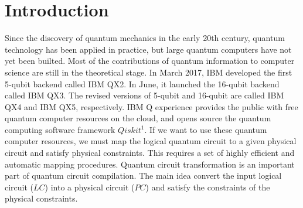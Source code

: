 \documentclass[runningheads]{llncs}
\begin{document}
\section{Introduction}
\label{Introduction}
Since the discovery of quantum mechanics in the early 20th century,
quantum technology has been applied in practice, but large quantum computers
have not yet been builted. Most of the contributions of quantum 
information to computer science are still in the theoretical stage.
In March 2017, IBM developed the first 5-qubit backend called IBM QX2. 
In June, it launched the 16-qubit backend called IBM QX3. 
The revised versions of 5-qubit and 16-qubit 
are called IBM QX4 and IBM QX5, respectively.
IBM Q experience provides the public with free quantum computer resources on the cloud,
and opens source the quantum computing software framework $Qiskit^{1}$. 
If we want to use these quantum computer resources, 
we must map  the logical quantum circuit to a given physical circuit and 
satisfy physical constraints. This requires a set of highly efficient and 
automatic mapping procedures. Quantum circuit transformation is an important 
part of quantum circuit compilation. The main idea convert the input
logical circuit ($LC$) into a physical circuit ($PC$) and satisfy the constraints of
the physical constraints.
  
\end{document}
